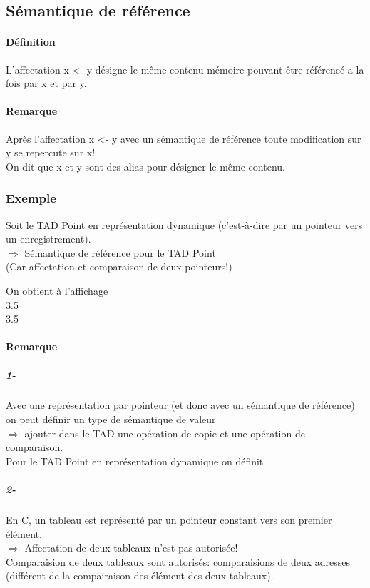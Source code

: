 	\subsection{Sémantique de référence}
		\paragraph{Définition}
			L'affectation x <- y désigne le même contenu mémoire pouvant être référencé a la fois par x et 
			par y.
		\paragraph{Remarque}
			Après l'affectation x <- y avec un sémantique de référence toute modification sur y se 
			repercute sur x! \\
			On dit que x et y sont des alias pour désigner le même contenu.	

		\subsubsection{Exemple}
			Soit le TAD Point en représentation dynamique (c'est-à-dire par un pointeur vers un
			enregistrement).\\
			$\Rightarrow$ Sémantique de référence pour le TAD Point\\
			(Car affectation et comparaison de deux pointeurs!)
							
			
			
			On obtient à l'affichage\\ 3.5\\3.5	
			\paragraph{Remarque}
				\subparagraph{1- }
					Avec une représentation par pointeur (et donc avec un sémantique de référence) 
					on peut définir un type de sémantique de valeur\\
					$\Rightarrow$ ajouter dans le TAD une opération de copie et une opération de 
					comparaison.\\
					Pour le TAD Point en représentation dynamique on définit
					
				\subparagraph{2- }
					En C, un tableau est représenté par un pointeur constant vers son premier élément. 	\\
					$\Rightarrow$ Affectation de deux tableaux n'est pas autorisée!\\
					Comparaision de deux tableaux sont autorisés: comparaisions de deux adresses (différent
					de la compairaison des élément des deux tableaux).


